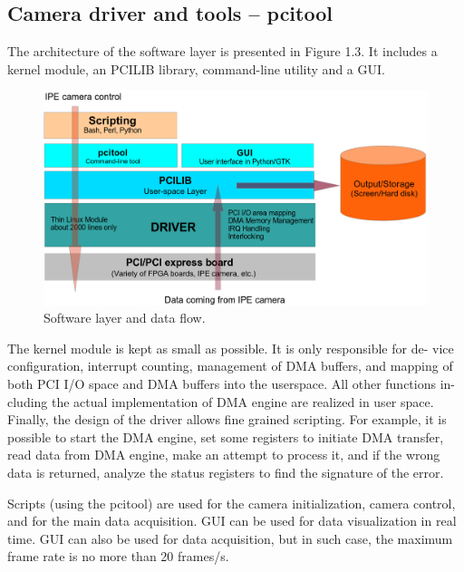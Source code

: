 \subsection{Camera driver and tools -- pcitool}

The architecture of the software layer is presented in Figure 1.3. It includes a kernel module, an PCILIB library, command-line utility and a GUI.

\begin{figure}
\includegraphics[width=\textwidth]{images/software_layer3.png}
\caption{\label{pcitool-arch} Software layer and data flow.}
\end{figure}

The kernel module is kept as small as possible. It is only responsible for de- vice configuration, interrupt counting, management of DMA buffers, and mapping of both PCI I/O space and DMA buffers into the userspace. All other functions in- cluding the actual implementation of DMA engine are realized in user space. Finally, the design of the driver allows fine grained scripting. For example, it is possible to start the DMA engine, set some registers to initiate DMA transfer, read data from DMA engine, make an attempt to process it, and if the wrong data is returned, analyze the status registers to find the signature of the error.

Scripts (using the pcitool) are used for the camera initialization, camera control, and for the main data acquisition. GUI can be used for data visualization in real time. GUI can also be used for data acquisition, but in such case, the maximum
frame rate is no more than 20 frames/s.



